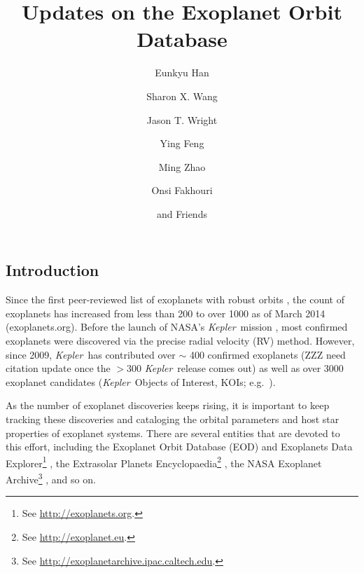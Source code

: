 \documentclass[11pt,preprint]{aastex}
\def\kepler{\textit{Kepler}}
\begin{document}
\begin{CJK*}{UTF8}{gbsn}

\title{Updates on the Exoplanet Orbit Database}

\author{Eunkyu Han}
\author{Sharon X. Wang}
\author{Jason T. Wright}
\author{Ying Feng}
\author{Ming Zhao}
\author{Onsi Fakhouri}
\author{and Friends}



\begin{abstract}

\end{abstract}  

\section{Introduction}\label{sec:intro}

Since the first peer-reviewed list of exoplanets with robust orbits
\citep{Butler2002,Butler2006}, the count of exoplanets has increased
from less than 200 to over 1000 as of March 2014
(exoplanets.org). Before the launch of NASA's \kepler\ mission
\citep{Borucki2010}, most confirmed exoplanets were discovered via the
precise radial velocity (RV) method. However, since 2009, \kepler\ has
contributed over $\sim$ 400 confirmed exoplanets (ZZZ need citation
update once the $>300$ \kepler\ release comes out) as well as over
3000 exoplanet candidates (\kepler\ Objects of Interest, KOIs;
e.g.~\citealt{Batalha2013}).

As the number of exoplanet discoveries keeps rising, it is important
to keep tracking these discoveries and cataloging the orbital
parameters and host star properties of exoplanet systems. There are
several entities that are devoted to this effort, including the
Exoplanet Orbit Database (EOD) and Exoplanets Data Explorer\footnote{See
  \url{http://exoplanets.org}.} \citep{Wright2011}, the Extrasolar
Planets Encyclopaedia\footnote{See \url{http://exoplanet.eu}.}
\citep{Schneider2011}, the NASA Exoplanet Archive\footnote{See
  \url{http://exoplanetarchive.ipac.caltech.edu}.}
\citep{Akeson2013}, and so on.


\end{CJK*}
\end{document}
